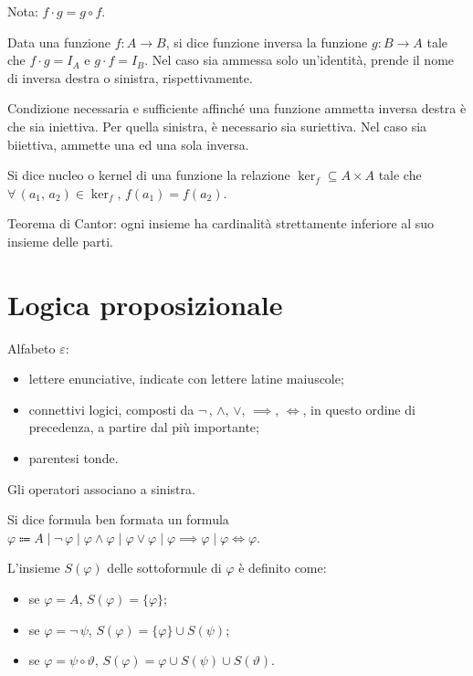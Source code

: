 \documentclass[10pt]{article}
\begin{document}
                Nota: \(f \cdot g = g \circ f\).

                Data una funzione \(f : A \to B\), si dice funzione inversa la funzione \(g : B \to A\) tale che
                \(f \cdot g = I_A\) e \(g \cdot f = I_B\). Nel caso sia ammessa solo un'identità, prende il nome di inversa destra
                o sinistra, rispettivamente.

                Condizione necessaria e sufficiente affinché una funzione ammetta inversa destra è che sia iniettiva. Per quella
                sinistra, è necessario sia suriettiva. Nel caso sia biiettiva, ammette una ed una sola inversa.

                Si dice nucleo o kernel di una funzione la relazione \(\ker_f \subseteq A \times A\) tale che
                \(\forall \, (a_1, \, a_2) \in \ker_f, \, f(a_1) = f(a_2)\).

                Teorema di Cantor: ogni insieme ha cardinalità strettamente inferiore al suo insieme delle parti.

    \section*{Logica proposizionale}

        Alfabeto \(\varepsilon\):
        \begin{itemize}
            \item lettere enunciative, indicate con lettere latine maiuscole;
            \item connettivi logici, composti da \(\neg \,, \, \land, \, \lor, \, \implies, \, \iff\), in questo ordine di precedenza,
                a partire dal più importante;
            \item parentesi tonde.
        \end{itemize}
        Gli operatori associano a sinistra.

        Si dice formula ben formata un formula \(\varphi \Coloneqq A \; | \; \neg \, \varphi \; | \; \varphi \land \varphi \; | \; \varphi \lor \varphi \; | \; \varphi \implies \varphi \; | \; \varphi \iff \varphi\).

        L'insieme \(S(\varphi)\) delle sottoformule di \(\varphi\) è definito come:
        \begin{itemize}
            \item se \(\varphi = A\), \(S(\varphi) = \{\varphi\}\);
            \item se \(\varphi = \neg \, \psi\), \(S(\varphi) = \{\varphi\} \cup S(\psi)\);
            \item se \(\varphi = \psi \circ \vartheta\), \(S(\varphi) = {\varphi} \cup S(\psi) \cup S(\vartheta)\).
        \end{itemize}
\end{document}
